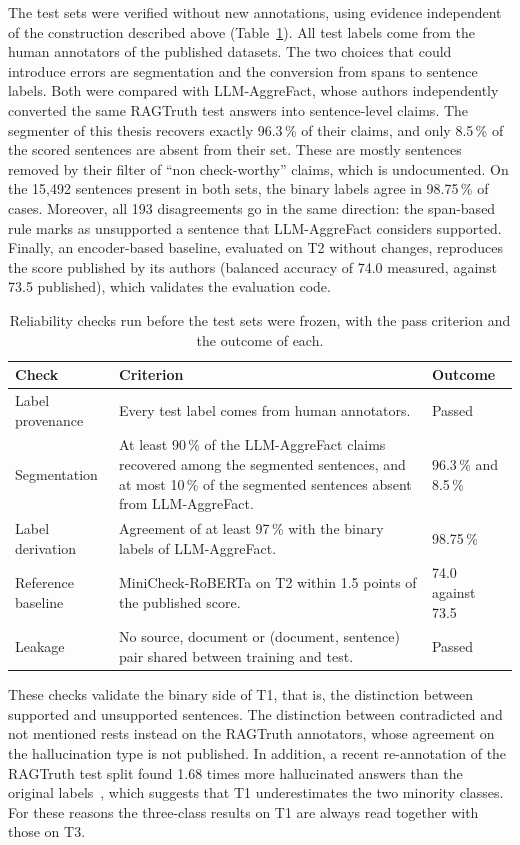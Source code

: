 The test sets were verified without new annotations, using evidence independent of the construction described above
(Table~\ref{tab:data-checks}). All test labels come from the human annotators of the published datasets. The two
choices that could introduce errors are segmentation and the conversion from spans to sentence labels. Both were
compared with LLM-AggreFact, whose authors independently converted the same RAGTruth test answers into sentence-level
claims. The segmenter of this thesis recovers exactly 96.3\,\% of their claims, and only 8.5\,\% of the scored
sentences are absent from their set. These are mostly sentences removed by their filter of ``non check-worthy''
claims, which is undocumented. On the 15{,}492 sentences present in both sets, the binary labels agree in 98.75\,\% of
cases. Moreover, all 193 disagreements go in the same direction: the span-based rule marks as unsupported a sentence
that LLM-AggreFact considers supported. Finally, an encoder-based baseline, evaluated on T2 without changes, reproduces
the score published by its authors (balanced accuracy of 74.0 measured, against 73.5 published), which validates the
evaluation code.

\begin{table}[htbp]
\centering
\caption{Reliability checks run before the test sets were frozen, with the pass criterion and the outcome of each.}
\label{tab:data-checks}
\small
\begin{tabularx}{\textwidth}{@{}lXl@{}}
\toprule
Check & Criterion & Outcome \\
\midrule
Label provenance & Every test label comes from human annotators. & Passed \\
Segmentation & At least 90\,\% of the LLM-AggreFact claims recovered among the segmented sentences, and at most 10\,\% of the segmented sentences absent from LLM-AggreFact. & 96.3\,\% and 8.5\,\% \\
Label derivation & Agreement of at least 97\,\% with the binary labels of LLM-AggreFact. & 98.75\,\% \\
Reference baseline & MiniCheck-RoBERTa on T2 within 1.5 points of the published score. & 74.0 against 73.5 \\
Leakage & No source, document or (document, sentence) pair shared between training and test. & Passed \\
\bottomrule
\end{tabularx}
\end{table}

These checks validate the binary side of T1, that is, the distinction between supported and unsupported sentences. The
distinction between contradicted and not mentioned rests instead on the RAGTruth annotators, whose agreement on the
hallucination type is not published. In addition, a recent re-annotation of the RAGTruth test split found 1.68 times
more hallucinated answers than the original labels~\cite{yu2026retromorphic}, which suggests that T1 underestimates the
two minority classes. For these reasons the three-class results on T1 are always read together with those on T3.

